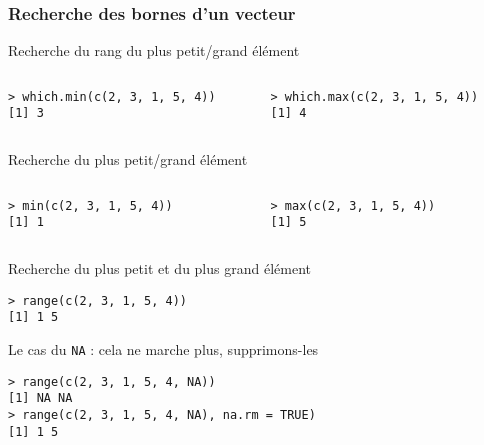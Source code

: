 \documentclass[10pt]{beamer}
\begin{document}
\begin{frame}[fragile]
  \frametitle{Recherche des bornes d'un vecteur}
  \begin{block}{Recherche du rang du plus petit/grand élément}
    \begin{columns}[t]
      \begin{column}{0.49\textwidth}
  \begin{lstlisting}
> which.min(c(2, 3, 1, 5, 4))
[1] 3
  \end{lstlisting}
\end{column}
\begin{column}{0.49\textwidth}
  \begin{lstlisting}
> which.max(c(2, 3, 1, 5, 4))
[1] 4    
\end{lstlisting}
\end{column}
\end{columns}
\end{block}

\begin{block}{Recherche du plus petit/grand élément}
  \begin{columns}[t]
      \begin{column}{0.49\textwidth}
  \begin{lstlisting}
> min(c(2, 3, 1, 5, 4))
[1] 1
  \end{lstlisting}
\end{column}
\begin{column}{0.49\textwidth}
  \begin{lstlisting}
> max(c(2, 3, 1, 5, 4))
[1] 5    
\end{lstlisting}
\end{column}
\end{columns}    
  \end{block}

  \begin{block}{Recherche du plus petit et du plus grand élément}
   \begin{lstlisting}[style=block]
> range(c(2, 3, 1, 5, 4))
[1] 1 5    
  \end{lstlisting}
\end{block} 
\begin{block}{Le cas du \texttt{NA} : cela ne marche plus, supprimons-les}
  \begin{lstlisting}[style=block]
> range(c(2, 3, 1, 5, 4, NA))
[1] NA NA
> range(c(2, 3, 1, 5, 4, NA), na.rm = TRUE)
[1] 1 5
  \end{lstlisting}
\end{block}
\end{frame}
\end{document}
